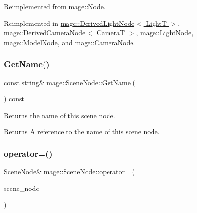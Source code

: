 Reimplemented from \hyperlink{classmage_1_1_node_a71a4763bfd4cba5653488b490e61dc8f}{mage\+::\+Node}.



Reimplemented in \hyperlink{classmage_1_1_derived_light_node_acf8858989780bf45a45c55a7c5564314}{mage\+::\+Derived\+Light\+Node$<$ Light\+T $>$}, \hyperlink{classmage_1_1_derived_camera_node_aa965751029ebd6b41d3805b499a8304e}{mage\+::\+Derived\+Camera\+Node$<$ Camera\+T $>$}, \hyperlink{classmage_1_1_light_node_aea97601d0a4b8073a1c655ca334af242}{mage\+::\+Light\+Node}, \hyperlink{classmage_1_1_model_node_a34146201083015276b38240af307417f}{mage\+::\+Model\+Node}, and \hyperlink{classmage_1_1_camera_node_a002d3a2b41cda270a26ca5d8f3a17f55}{mage\+::\+Camera\+Node}.

\hypertarget{classmage_1_1_scene_node_ab4d72e26370747c06ccb1461f3080b31}{}\label{classmage_1_1_scene_node_ab4d72e26370747c06ccb1461f3080b31} 
\subsubsection{\texorpdfstring{Get\+Name()}{GetName()}}
{\footnotesize\ttfamily const string\& mage\+::\+Scene\+Node\+::\+Get\+Name (\begin{DoxyParamCaption}{ }\end{DoxyParamCaption}) const\hspace{0.3cm}{\ttfamily [noexcept]}}

Returns the name of this scene node.

\begin{DoxyReturn}{Returns}
A reference to the name of this scene node. 
\end{DoxyReturn}
\hypertarget{classmage_1_1_scene_node_af4298cbc808139f9da43055afdfe8f7e}{}\label{classmage_1_1_scene_node_af4298cbc808139f9da43055afdfe8f7e} 
\subsubsection{\texorpdfstring{operator=()}{operator=()}\hspace{0.1cm}{\footnotesize\ttfamily [1/2]}}
{\footnotesize\ttfamily \hyperlink{classmage_1_1_scene_node}{Scene\+Node}\& mage\+::\+Scene\+Node\+::operator= (\begin{DoxyParamCaption}\item[{const \hyperlink{classmage_1_1_scene_node}{Scene\+Node} \&}]{scene\+\_\+node }\end{DoxyParamCaption})\hspace{0.3cm}{\ttfamily [delete]}}

